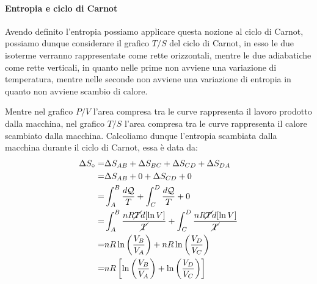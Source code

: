    \paragraph{Entropia e ciclo di Carnot}
        Avendo definito l'entropia possiamo applicare questa nozione al ciclo di Carnot, possiamo dunque considerare il grafico $T/S$ del ciclo di Carnot, in esso le due isoterme verranno rappresentate come rette orizzontali, mentre le due adiabatiche come rette verticali, in quanto nelle prime non avviene una variazione di temperatura, mentre nelle seconde non avviene una variazione di entropia in quanto non avviene scambio di calore.
        \begin{figure}[H]
            \centering
        \end{figure}
        Mentre nel grafico $P/V$ l'area compresa tra le curve rappresenta il lavoro prodotto dalla macchina, nel grafico $T/S$ l'area compresa tra le curve rappresenta il calore scambiato dalla macchina. Calcoliamo dunque l'entropia scambiata dalla macchina durante il ciclo di Carnot, essa è data da:
        \begin{align*}
            \Delta S_{\circ} =& \Delta S_{AB} + \Delta S_{BC} + \Delta S_{CD} + \Delta S_{DA}\\
            =& \Delta S_{AB} + 0 + \Delta S_{CD} + 0\\
            =& \int_{A}^{B} \frac{d\mathcal{Q}}{T} + \int_{C}^{D} \frac{d\mathcal{Q}}{T} + 0\\
            =& \int_{A}^{B} \frac{nR\cancel{T}d[\operatorname{ln} V]}{\cancel{T}} + \int_{C}^{D} \frac{nR\cancel{T}d[\operatorname{ln} V]}{\cancel{T}}\\
            =& nR\operatorname{ln}\left(\frac{V_B}{V_A}\right) + nR\operatorname{ln}\left(\frac{V_D}{V_C}\right)\\
            =& nR\left[\operatorname{ln}\left(\frac{V_B}{V_A}\right) + \operatorname{ln}\left(\frac{V_D}{V_C}\right)\right]\\
        \end{align*}
